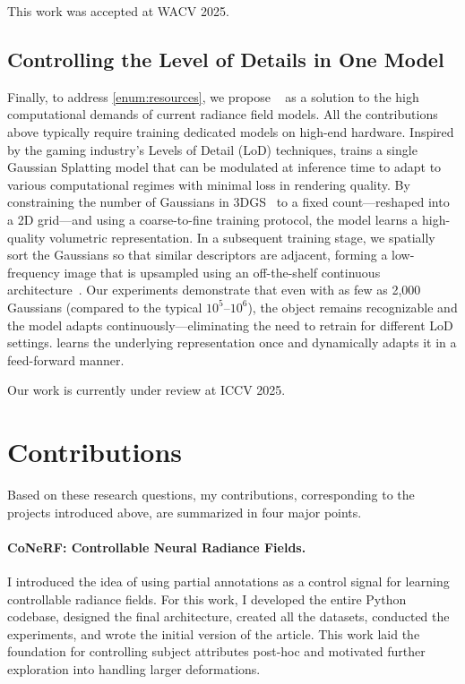     This work was accepted at WACV 2025.

  \subsection{Controlling the Level of Details in One Model}
    Finally, to address \ref{enum:resources}, we propose
    \clog~\cite{kania2024clog} as a solution to the high computational demands of
    current radiance field models.
    All the contributions above typically require training dedicated models on
    high-end hardware.
    Inspired by the gaming industry's Levels of Detail (LoD) techniques, \clog
    trains a single Gaussian Splatting model that can be modulated at inference
    time to adapt to various computational regimes with minimal loss in rendering
    quality.
    By constraining the number of Gaussians in 3DGS~\cite{kerbl20233d} to a fixed
    count---reshaped into a 2D grid---and using a coarse-to-fine training
    protocol, the model learns a high-quality volumetric representation.
    In a subsequent training stage, we spatially sort the Gaussians so that
    similar descriptors are adjacent, forming a low-frequency image that is
    upsampled using an off-the-shelf continuous
    architecture~\cite{vasconcelos2023cuf}.
    Our experiments demonstrate that even with as few as 2,000 Gaussians (compared
    to the typical $10^5$--$10^6$), the object remains recognizable and the model
    adapts continuously---eliminating the need to retrain for different LoD
    settings.
    \clog learns the underlying representation once and dynamically adapts it in a feed-forward manner.

    Our work is currently under review at ICCV 2025.

\section{Contributions}
  Based on these research questions, my contributions, corresponding to the
  projects introduced above, are summarized in four major points.

  \paragraph{CoNeRF: Controllable Neural Radiance Fields.}
    I introduced the idea of using partial annotations as a control signal for
    learning controllable radiance fields.
    For this work, I developed the entire Python codebase, designed the final
    \conerf architecture, created all the datasets, conducted the experiments, and
    wrote the initial version of the article.
    This work laid the foundation for controlling subject attributes post-hoc and
    motivated further exploration into handling larger deformations.


